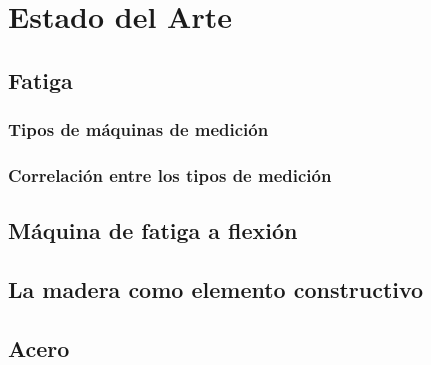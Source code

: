 \chapter{Estado del Arte}

\section{Fatiga}

\subsection{Tipos de máquinas de medición}
\subsection{Correlación entre los tipos de medición}

\section{Máquina de fatiga a flexión}

\section{La madera como elemento constructivo}

\section{Acero}



